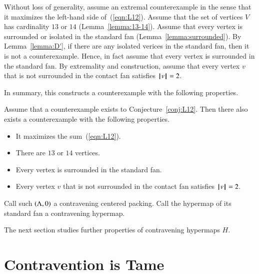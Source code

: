 {Without loss of generality,
assume an extremal counterexample in the sense that it maximizes the left-hand side of~(\ref{eqn:L12}).  Assume that the set of vertices $V$ has cardinality $13$ or $14$ (Lemma~\ref{lemma:13-14}). Assume that every vertex is surrounded or isolated in the standard fan (Lemma~\ref{lemma:surrounded}).  By Lemma~\ref{lemma:D'}, if there are any isolated verices in the standard fan, then it is not a counterexample.  Hence, in fact assume that every vertex is surrounded in the standard fan. By extremality and construction,  assume that every vertex $v$ that is not surrounded in the contact fan satisfies ${{\hskip0.1em|\hskip-0.15em|\hskip0.1em}v{\hskip0.1em|\hskip-0.15em|\hskip0.1em}}=2$.



In summary, this constructs a counterexample with the following properties.

\begin{lemma}\label{lemma:CE} 
Assume that a counterexample exists to Conjecture~\ref{conj:L12}.  Then there also exists a counterexample with the following properties.
\begin{itemize}
\item It maximizes the sum~(\ref{eqn:L12}).
\item There are $13$ or $14$ vertices.
\item Every vertex is surrounded in the standard fan.
\item Every vertex $v$ that is not surrounded in the contact
fan satisfies ${{\hskip0.1em|\hskip-0.15em|\hskip0.1em}v{\hskip0.1em|\hskip-0.15em|\hskip0.1em}}=2$.
\end{itemize}
\end{lemma}





\begin{definition}
Call such $(\Lambda,0)$ a contravening centered packing. 
Call the hypermap of its standard fan a contravening hypermap.
\end{definition}


The next section studies further properties of contravening hypermaps $H$.



\section{Contravention is Tame}
    \label{sec:contraproof}

}
